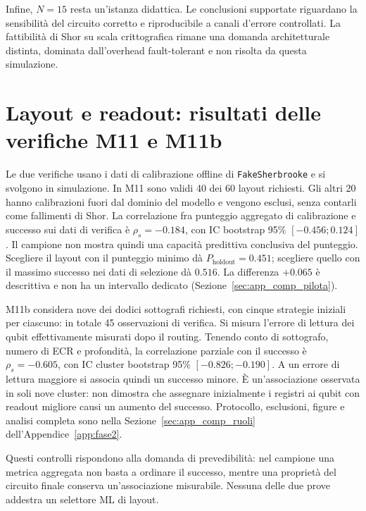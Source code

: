 \begin{onehalfspace}
Infine, $N=15$ resta un'istanza didattica. Le conclusioni supportate riguardano la sensibilit\`a del circuito corretto e riproducibile a canali d'errore controllati. La fattibilit\`a di Shor su scala crittografica rimane una domanda architetturale distinta, dominata dall'overhead fault-tolerant e non risolta da questa simulazione.

\section{Layout e readout: risultati delle verifiche M11 e M11b}
\label{sec:layout_risultati}

Le due verifiche usano i dati di calibrazione offline di \texttt{FakeSherbrooke} e si svolgono in simulazione. In M11 sono validi 40 dei 60 layout richiesti. Gli altri 20 hanno calibrazioni fuori dal dominio del modello e vengono esclusi, senza contarli come fallimenti di Shor. La correlazione fra punteggio aggregato di calibrazione e successo sui dati di verifica è $\rho_s=-0.184$, con IC bootstrap 95\% $[-0.456;0.124]$. Il campione non mostra quindi una capacità predittiva conclusiva del punteggio. Scegliere il layout con il punteggio minimo dà $P_{\mathrm{holdout}}=0.451$; scegliere quello con il massimo successo nei dati di selezione dà $0.516$. La differenza $+0.065$ è descrittiva e non ha un intervallo dedicato (Sezione~\ref{sec:app_comp_pilota}).

M11b considera nove dei dodici sottografi richiesti, con cinque strategie iniziali per ciascuno: in totale 45 osservazioni di verifica. Si misura l'errore di lettura dei qubit effettivamente misurati dopo il routing. Tenendo conto di sottografo, numero di ECR e profondità, la correlazione parziale con il successo è $\rho_s=-0.605$, con IC cluster bootstrap 95\% $[-0.826;-0.190]$. A un errore di lettura maggiore si associa quindi un successo minore. È un'associazione osservata in soli nove cluster: non dimostra che assegnare inizialmente i registri ai qubit con readout migliore causi un aumento del successo. Protocollo, esclusioni, figure e analisi completa sono nella Sezione~\ref{sec:app_comp_ruoli} dell'Appendice~\ref{app:fase2}.

Questi controlli rispondono alla domanda di prevedibilità: nel campione
una metrica aggregata non basta a ordinare il successo, mentre una
proprietà del circuito finale conserva un'associazione misurabile.
Nessuna delle due prove addestra un selettore ML di layout.

\end{onehalfspace}

